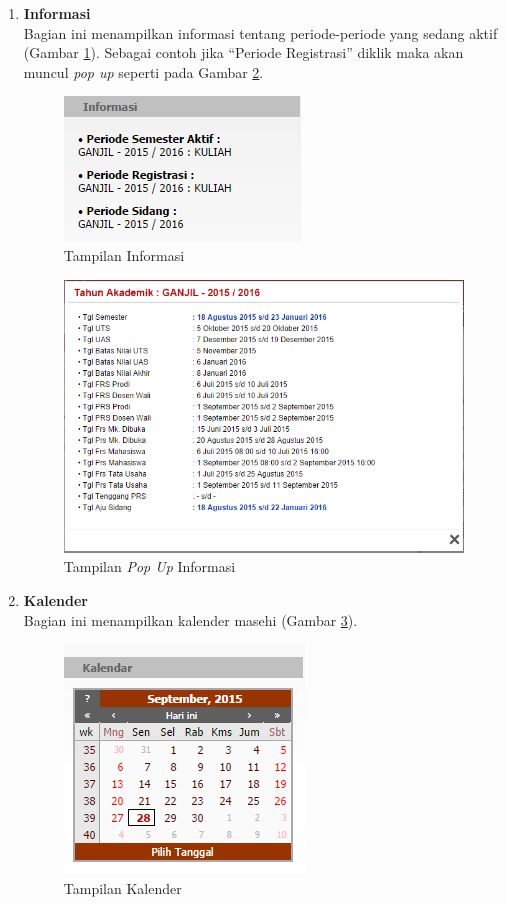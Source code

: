 \begin{enumerate}
	\item \textbf{Informasi}\\
		Bagian ini menampilkan informasi tentang periode-periode yang sedang aktif (Gambar \ref{fig:3_pam_utama_informasi}). Sebagai contoh jika ``Periode Registrasi'' diklik maka akan muncul \textit{pop up} seperti pada Gambar \ref{fig:3_pam_utama_informasipop}.
			\begin{figure}[H]
				\centering
				\includegraphics[scale=0.75]{Gambar/pam-utama-informasi}
				\caption{Tampilan Informasi} 
				\label{fig:3_pam_utama_informasi}
			\end{figure}
			
			\begin{figure}[H]
				\centering
				\includegraphics[scale=0.5]{Gambar/pam-utama-infopop}
				\caption{Tampilan \textit{Pop Up} Informasi} 
				\label{fig:3_pam_utama_informasipop}
			\end{figure}
		
	\item \textbf{Kalender}\\
		Bagian ini menampilkan kalender masehi (Gambar \ref{fig:3_pam_utama_kalender}).
		\begin{figure}[H]
				\centering
				\includegraphics[scale=0.75]{Gambar/pam-utama-kalender}
				\caption{Tampilan Kalender} 
				\label{fig:3_pam_utama_kalender}
			\end{figure}
		

\end{enumerate}
